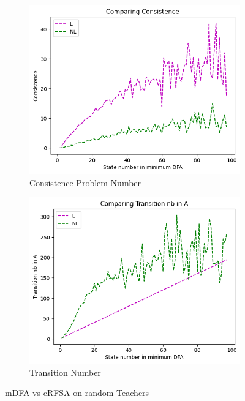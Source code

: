 \begin{figure}[!htb]
\begin{subfigure}[b]{0.3\textwidth}
    \includegraphics[width=\textwidth]{../statistics/plots/BenchMark/Consistence.png}
    \caption{Consistence Problem Number}
    \label{fig:ConsistenceBenchMarkCompare}
  \end{subfigure}
  \begin{subfigure}[b]{0.3\textwidth}
    \includegraphics[width=\textwidth]{../statistics/plots/BenchMark/Transition nb in A.png}
    \caption{Transition Number}
    \label{fig:TransitionBenchMarkCompare}
  \end{subfigure}
  \caption{mDFA vs cRFSA on random Teachers}
  \label{fig:benchmark}
\end{figure}

